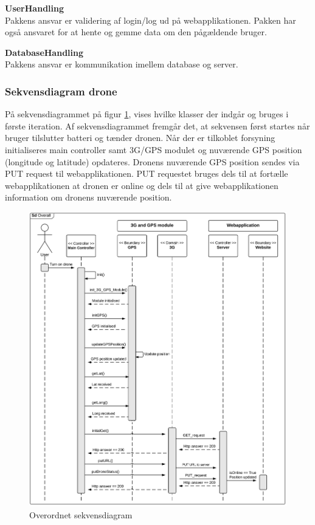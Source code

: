 \textbf{UserHandling}\\
Pakkens ansvar er validering af login/log ud på webapplikationen. Pakken har også ansvaret for at hente og gemme data om den pågældende bruger.

\textbf{DatabaseHandling}\\
Pakkens ansvar er kommunikation imellem database og server. 


\newpage
\subsubsection*{Sekvensdiagram drone}
På sekvensdiagrammet på figur \ref{fig:Sekvens_diagram_iteration1}, vises hvilke klasser der indgår og bruges i første iteration. Af sekvensdiagrammet fremgår det, at sekvensen først startes når bruger tilslutter batteri og tænder dronen. Når der er tilkoblet forsyning initialiseres main controller samt 3G/GPS modulet og nuværende GPS position  (longitude og latitude) opdateres. Dronens nuværende GPS position sendes via PUT request til webapplikationen. PUT requestet bruges dels til at fortælle webapplikationen at dronen er online og dels til at give webapplikationen information om dronens nuværende position. 

\begin{figure}[H]
	\centering
	\includegraphics[width=1\textwidth]{Billeder/sekvens/sekvens_iteration1}
	\caption{Overordnet sekvensdiagram}
	\label{fig:Sekvens_diagram_iteration1}
\end{figure}
\newpage

